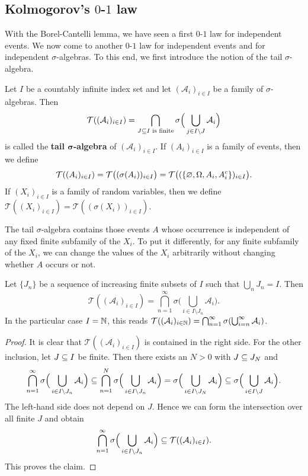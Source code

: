 \subsection{Kolmogorov's \boldmath$0$-$1$ law}
With the Borel-Cantelli lemma, we have seen a first $0$-$1$ law for independent events. We now come to another $0$-$1$ law for independent events and for independent $\sigma$-algebras. To this end, we first introduce the notion of the tail $\sigma$-algebra.
\begin{definition}
Let $I$ be a countably infinite index set and let $(\mathcal{A}_i)_{i\in I}$ be a family of $\sigma$-algebras. Then
\[\mathcal{T}((\mathcal{A}_i)_{i\in I})=\bigcap_{J\subseteq I\text{ is finite}}\sigma\Big(\bigcup_{j\in I\setminus J}\mathcal{A}_i\Big)\]
is called the \textbf{tail $\bm{\sigma}$-algebra} of $(\mathcal{A}_i)_{i\in I}$. If $(A_i)_{i\in I}$ is a family of events, then we define
\[\mathcal{T}((A_i)_{i\in I})=\mathcal{T}\big((\sigma(A_i))_{i\in I}\big)=\mathcal{T}\big((\{\varnothing,\Omega,A_i,A_i^c\})_{i\in I}\big).\]
If $(X_i)_{i\in I}$ is a family of random variables, then we define $\mathcal{T}((X_i)_{i\in I})=\mathcal{T}((\sigma(X_i))_{i\in I})$.
\end{definition}
The tail $\sigma$-algebra contains those events $A$ whose occurrence is independent of any fixed finite subfamily of the $X_i$. To put it differently, for any finite subfamily of the $X_i$, we can change the values of the $X_i$ arbitrarily without changing whether $A$ occurs or not.
\begin{theorem}
Let $\{J_n\}$ be a sequence of increasing finite subsets of $I$ such that $\bigcup_nJ_n=I$. Then
\[\mathcal{T}((\mathcal{A}_i)_{i\in I})=\bigcap_{n=1}^{\infty}\sigma\Big(\bigcup_{i\in I\setminus J_n}\mathcal{A}_i\Big).\]
In the particular case $I=\mathbb{N}$, this reads $\mathcal{T}((\mathcal{A}_i)_{i\in\mathbb{N}})=\bigcap_{n=1}^{\infty}\sigma(\bigcup_{i=n}^{\infty}\mathcal{A}_i)$.
\end{theorem}
\begin{proof}
It is clear that $\mathcal{T}((\mathcal{A}_i)_{i\in I})$ is contained in the right side. For the other inclusion, let $J\subseteq I$ be finite. Then there exists an $N>0$ with $J\subseteq J_N$ and
\begin{align*}
\bigcap_{n=1}^{\infty}\sigma\Big(\bigcup_{i\in I\setminus J_n}\mathcal{A}_i\Big)\subseteq\bigcap_{n=1}^{N}\sigma\Big(\bigcup_{i\in I\setminus J_n}\mathcal{A}_i\Big)=\sigma\Big(\bigcup_{i\in I\setminus J_N}\mathcal{A}_i\Big)\subseteq\sigma\Big(\bigcup_{i\in I\setminus J}\mathcal{A}_i\Big).
\end{align*}
The left-hand side does not depend on $J$. Hence we can form the intersection over all finite $J$ and obtain
\[\bigcap_{n=1}^{\infty}\sigma\Big(\bigcup_{i\in I\setminus J_n}\mathcal{A}_i\Big)\subseteq \mathcal{T}((\mathcal{A}_i)_{i\in I}).\]
This proves the claim.
\end{proof}
